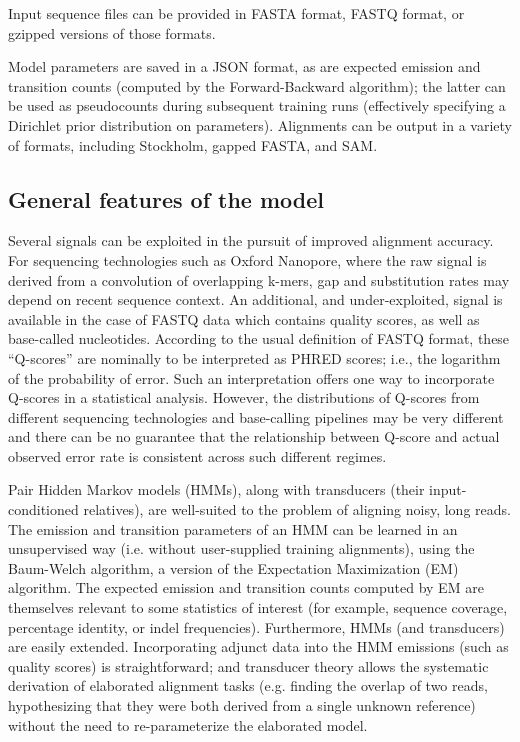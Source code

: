 \documentclass{article}
\begin{document}
Input sequence files can be provided in FASTA format, FASTQ format, or gzipped versions of those formats.

Model parameters are saved in a JSON format, as are expected emission and transition counts (computed by the Forward-Backward algorithm); the latter can be used as pseudocounts during subsequent training runs (effectively specifying a Dirichlet prior distribution on parameters). Alignments can be output in a variety of formats, including Stockholm, gapped FASTA, and SAM.


\subsection{General features of the model}

Several signals can be exploited in the pursuit of improved alignment accuracy. For sequencing technologies such as Oxford Nanopore, where the raw signal is derived from a convolution of overlapping k-mers, gap and substitution rates may depend on recent sequence context.
An additional, and under-exploited, signal is available in the case of FASTQ data which contains quality scores, as well as base-called nucleotides. According to the usual definition of FASTQ format, these ``Q-scores'' are nominally to be interpreted as PHRED scores; i.e., the logarithm of the probability of error. Such an interpretation offers one way to incorporate Q-scores in a statistical analysis.  However, the distributions of Q-scores from different sequencing technologies and base-calling pipelines may be very different and there can be no guarantee that the relationship between Q-score and actual observed error rate is consistent across such different regimes.

Pair Hidden Markov models (HMMs), along with transducers (their input-conditioned relatives), are well-suited to the problem of aligning noisy, long reads. The emission and transition parameters of an HMM can be learned in an unsupervised way (i.e. without user-supplied training alignments), using the Baum-Welch algorithm, a version of the Expectation Maximization (EM) algorithm. The expected emission and transition counts computed by EM are themselves relevant to some statistics of interest (for example, sequence coverage, percentage identity, or indel frequencies). Furthermore, HMMs (and transducers) are easily extended. Incorporating adjunct data into the HMM emissions (such as quality scores) is straightforward; and transducer theory allows the systematic derivation of elaborated alignment tasks (e.g. finding the overlap of two reads, hypothesizing that they were both derived from a single unknown reference) without the need to re-parameterize the elaborated model.
\end{document}
